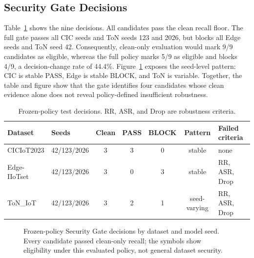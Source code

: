 \documentclass[runningheads]{llncs}
\begin{document}
\subsection{Security Gate Decisions}
Table~\ref{tab:gate} shows the nine decisions. All candidates pass the clean recall floor. The full gate passes all CIC seeds and ToN seeds 123 and 2026, but blocks all Edge seeds and ToN seed 42. Consequently, clean-only evaluation would mark 9/9 candidates as eligible, whereas the full policy marks 5/9 as eligible and blocks 4/9, a decision-change rate of 44.4\%. Figure~\ref{fig:gate} exposes the seed-level pattern: CIC is stable PASS, Edge is stable BLOCK, and ToN is variable. Together, the table and figure show that the gate identifies four candidates whose clean evidence alone does not reveal policy-defined insufficient robustness.

\begin{table}[t]
\caption{Frozen-policy test decisions. RR, ASR, and Drop are robustness criteria.}
\label{tab:gate}
\centering\scriptsize
\setlength{\tabcolsep}{3pt}
\begin{tabular}{llccccl}
\toprule
Dataset & Seeds & Clean & PASS & BLOCK & Pattern & Failed criteria\\
\midrule
CICIoT2023 & 42/123/2026 & 3 & 3 & 0 & stable & none\\
Edge-IIoTset & 42/123/2026 & 3 & 0 & 3 & stable & RR, ASR, Drop\\
ToN\_IoT & 42/123/2026 & 3 & 2 & 1 & seed-varying & RR, ASR, Drop\\
\bottomrule
\end{tabular}
\end{table}

\begin{figure}[t]
\centering
{}
\caption{Frozen-policy Security Gate decisions by dataset and model seed. Every candidate passed clean-only recall; the symbols show eligibility under this evaluated policy, not general dataset security.}
\label{fig:gate}
\end{figure}
\end{document}
